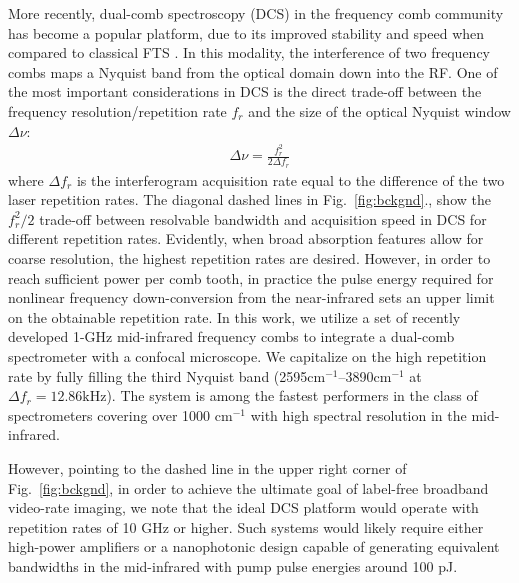 \documentclass{optica-article}
\begin{document}
More recently, dual-comb spectroscopy (DCS) in the frequency comb community has become a popular platform, due to its improved stability and speed when compared to classical FTS \cite{coddington_dual-comb_2016}. In this modality, the interference of two frequency combs maps a Nyquist band from the optical domain down into the RF. One of the most important considerations in DCS is the direct trade-off between the frequency resolution/repetition rate $f_r$ and the size of the optical Nyquist window $\Delta \nu$:
% 
\begin{align}
    \Delta \nu = \frac{f_r^2}{2 \Delta f_r}
\end{align}
% 
where $\Delta f_r$ is the interferogram acquisition rate equal to the difference of the two laser repetition rates. The diagonal dashed lines in Fig.~\ref{fig:bckgnd}., show the $f_r^2/2$ trade-off between resolvable bandwidth and acquisition speed in DCS for different repetition rates. Evidently, when broad absorption features allow for coarse resolution, the highest repetition rates are desired. However, in order to reach sufficient power per comb tooth, in practice the pulse energy required for nonlinear frequency down-conversion from the near-infrared sets an upper limit on the obtainable repetition rate. In this work, we utilize a set of recently developed 1-GHz mid-infrared frequency combs \cite{hoghooghi_broadband_2022} to integrate a dual-comb spectrometer with a confocal microscope. We capitalize on the high repetition rate by fully filling the third Nyquist band (2595$\mathrm{cm^{-1}}$--3890$\mathrm{cm^{-1}}$ at $\Delta f_r=12.86\text{kHz}$). The system is among the fastest performers in the class of spectrometers covering over 1000 $\mathrm{cm^{-1}}$ with high spectral resolution in the mid-infrared.

However, pointing to the dashed line in the upper right corner of Fig.~\ref{fig:bckgnd}, in order to achieve the ultimate goal of label-free broadband video-rate imaging, we note that the ideal DCS platform would operate with repetition rates of 10 GHz or higher. Such systems would likely require either high-power amplifiers or a nanophotonic design capable of generating equivalent bandwidths in the mid-infrared with pump pulse energies around 100 pJ.


\end{document}
